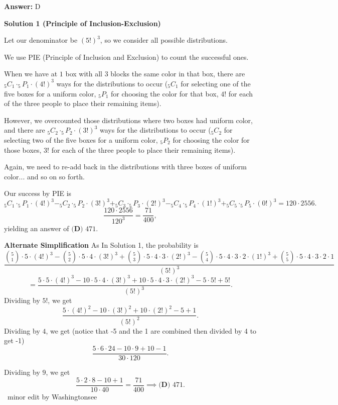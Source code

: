 \begin{enumerate}
 \textbf{Answer: }D



\textbf{Solution 1 (Principle of Inclusion-Exclusion)}

Let our denominator be $(5!)^3$, so we consider all possible distributions.

 We use PIE (Principle of Inclusion and Exclusion) to count the successful ones.

 When we have at $1$ box with all $3$ blocks the same color in that box, there are $_{5} C _{1} \cdot _{5} P _{1} \cdot (4!)^3$ ways for the distributions to occur ($_{5} C _{1}$ for selecting one of the five boxes for a uniform color, $_{5} P _{1}$ for choosing the color for that box, $4!$ for each of the three people to place their remaining items).

 However, we overcounted those distributions where two boxes had uniform color, and there are $_{5} C _{2} \cdot _{5} P _{2} \cdot (3!)^3$ ways for the distributions to occur ($_{5} C _{2}$ for selecting two of the five boxes for a uniform color, $_{5} P _{2}$ for choosing the color for those boxes, $3!$ for each of the three people to place their remaining items).

 Again, we need to re-add back in the distributions with three boxes of uniform color... and so on so forth.

 Our success by PIE is 
 \[_{5} C _{1} \cdot _{5} P _{1} \cdot (4!)^3 - _{5} C _{2} \cdot _{5} P _{2} \cdot (3!)^3 + _{5} C _{3} \cdot _{5} P _{3} \cdot (2!)^3 - _{5} C _{4} \cdot _{5} P _{4} \cdot (1!)^3 + _{5} C _{5} \cdot _{5} P _{5} \cdot (0!)^3 = 120 \cdot 2556.\]
 \[\frac{120 \cdot 2556}{120^3}=\frac{71}{400},\] yielding an answer of $\boxed{\textbf{(D) }471}$.

 \textbf{Alternate Simplification} As In Solution 1, the probability is
 \[\frac{\binom{5}{1}\cdot 5\cdot (4!)^3 - \binom{5}{2}\cdot 5\cdot 4\cdot (3!)^3 + \binom{5}{3}\cdot 5\cdot 4\cdot 3\cdot (2!)^3 - \binom{5}{4}\cdot 5\cdot 4\cdot 3\cdot 2\cdot (1!)^3 + \binom{5}{5}\cdot 5\cdot 4\cdot 3\cdot 2\cdot 1}{(5!)^3}\]
 \[= \frac{5\cdot 5\cdot (4!)^3 - 10\cdot 5\cdot 4\cdot (3!)^3 + 10\cdot 5\cdot 4\cdot 3\cdot (2!)^3 - 5\cdot 5! + 5!}{(5!)^3}.\]Dividing by $5!$, we get
 \[\frac{5\cdot (4!)^2 - 10\cdot (3!)^2 + 10\cdot (2!)^2 - 5 + 1}{(5!)^2}.\]Dividing by $4$, we get (notice that -5 and the 1 are combined then divided by 4 to get -1)
 \[\frac{5\cdot 6\cdot 24 - 10\cdot 9 + 10 - 1}{30\cdot 120}.\]

 Dividing by $9$, we get
 \[\frac{5\cdot 2\cdot 8 - 10 + 1}{10\cdot 40} = \frac{71}{400} \implies \boxed{\textbf{(D) }471}.\]~minor edit by Washingtonsee


\end{enumerate}
